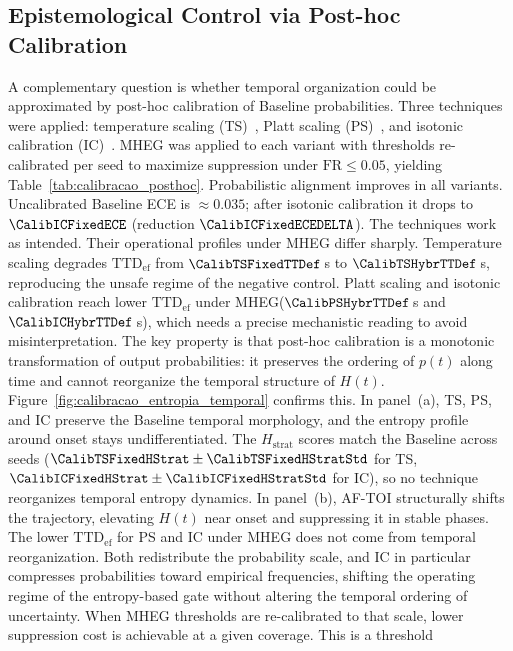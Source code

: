 \documentclass[a4paper,fleqn]{cas-dc}
\newcommand{\AFTOI}{\mbox{AF-TOI}\xspace}
\newcommand{\MHEG}{\mbox{MHEG}\xspace}
\begin{document}
\subsection{Epistemological Control via Post-hoc Calibration}
\label{sec:controle_calibracao}
A complementary question is whether temporal organization could be approximated
by post-hoc calibration of Baseline probabilities. Three techniques were
applied: temperature scaling (TS)~\cite{guo2017calibration}, Platt scaling (PS)~\cite{platt1999probabilistic},
and isotonic calibration (IC)~\cite{zadrozny2002isotonic}. \MHEG was applied to each variant with thresholds
re-calibrated per seed to maximize suppression under $\mathrm{FR} \le 0.05$,
yielding Table~\ref{tab:calibracao_posthoc}.
Probabilistic alignment improves in all variants. Uncalibrated Baseline ECE is
$\approx 0.035$; after isotonic calibration it drops to $\CalibICFixedECE$
(reduction $\CalibICFixedECEDELTA$). The techniques work as intended.
Their operational profiles under \MHEG differ sharply. Temperature scaling
degrades $\mathrm{TTD}_{\mathrm{ef}}$ from $\CalibTSFixedTTDef$\,s to
$\CalibTSHybrTTDef$\,s, reproducing the unsafe regime of the negative control.
Platt scaling and isotonic calibration reach lower $\mathrm{TTD}_{\mathrm{ef}}$
under \MHEG ($\CalibPSHybrTTDef$\,s and $\CalibICHybrTTDef$\,s), which needs a
precise mechanistic reading to avoid misinterpretation.
The key property is that post-hoc calibration is a monotonic transformation of
output probabilities: it preserves the ordering of $p(t)$ along time and cannot
reorganize the temporal structure of $H(t)$.
Figure~\ref{fig:calibracao_entropia_temporal} confirms this. In panel~(a), TS,
PS, and IC preserve the Baseline temporal morphology, and the entropy profile
around onset stays undifferentiated. The $H_{\mathrm{strat}}$ scores match the
Baseline across seeds ($\CalibTSFixedHStrat \pm \CalibTSFixedHStratStd$ for TS,
$\CalibICFixedHStrat \pm \CalibICFixedHStratStd$ for IC), so no technique
reorganizes temporal entropy dynamics. In panel~(b), \AFTOI structurally shifts
the trajectory, elevating $H(t)$ near onset and suppressing it in stable phases.
The lower $\mathrm{TTD}_{\mathrm{ef}}$ for PS and IC under \MHEG does not come
from temporal reorganization. Both redistribute the probability scale, and IC in
particular compresses probabilities toward empirical frequencies, shifting the
operating regime of the entropy-based gate without altering the temporal
ordering of uncertainty. When \MHEG thresholds are re-calibrated to that scale,
lower suppression cost is achievable at a given coverage. This is a threshold
\end{document}
